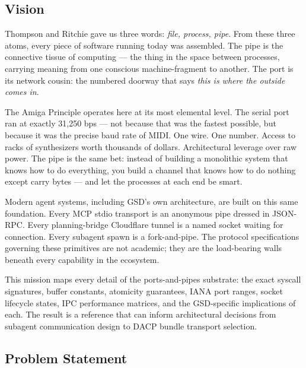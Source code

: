 \documentclass[11pt,letterpaper]{article}
\begin{document}
\subsection{Vision}

Thompson and Ritchie gave us three words: \textit{file, process, pipe}. From these three atoms, every piece of software running today was assembled. The pipe is the connective tissue of computing --- the thing in the space between processes, carrying meaning from one conscious machine-fragment to another. The port is its network cousin: the numbered doorway that says \textit{this is where the outside comes in}.

The Amiga Principle operates here at its most elemental level. The serial port ran at exactly 31,250 bps --- not because that was the fastest possible, but because it was the precise baud rate of MIDI. One wire. One number. Access to racks of synthesizers worth thousands of dollars. Architectural leverage over raw power. The pipe is the same bet: instead of building a monolithic system that knows how to do everything, you build a channel that knows how to do nothing except carry bytes --- and let the processes at each end be smart.

Modern agent systems, including GSD's own architecture, are built on this same foundation. Every MCP stdio transport is an anonymous pipe dressed in JSON-RPC. Every planning-bridge Cloudflare tunnel is a named socket waiting for connection. Every subagent spawn is a fork-and-pipe. The protocol specifications governing these primitives are not academic; they are the load-bearing walls beneath every capability in the ecosystem.

This mission maps every detail of the ports-and-pipes substrate: the exact syscall signatures, buffer constants, atomicity guarantees, IANA port ranges, socket lifecycle states, IPC performance matrices, and the GSD-specific implications of each. The result is a reference that can inform architectural decisions from subagent communication design to DACP bundle transport selection.

\subsection{Problem Statement}
\end{document}
